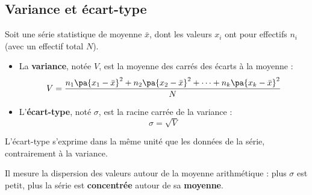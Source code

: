 \newpage

\subsection{Variance et écart-type}

\begin{defin}
	Soit une série statistique de moyenne $\bar{x}$, dont les valeurs $x_i$ ont pour effectifs $n_i$ (avec un effectif total $N$).
	\begin{itemize}
		\item La \textbf{variance}, notée $V$, est la moyenne des carrés des écarts à la moyenne :
		      \[
			      V = \dfrac{n_1\pa{x_1 - \bar{x}}^2 + n_2\pa{x_2 - \bar{x}}^2 + \dots + n_k\pa{x_k - \bar{x}}^2}{N}
		      \]
		\item L'\textbf{écart-type}, noté $\sigma$, est la racine carrée de la variance :
		      \[
			      \sigma = \sqrt{V}
		      \]
	\end{itemize}
\end{defin}

\begin{remarque}
	L'écart-type s'exprime dans la même unité que les données de la série, contrairement à la variance.

	Il mesure la dispersion des valeurs autour de la moyenne arithmétique : plus $\sigma$ est petit, plus la série est \textbf{concentrée} autour de sa \textbf{moyenne}.
\end{remarque}

